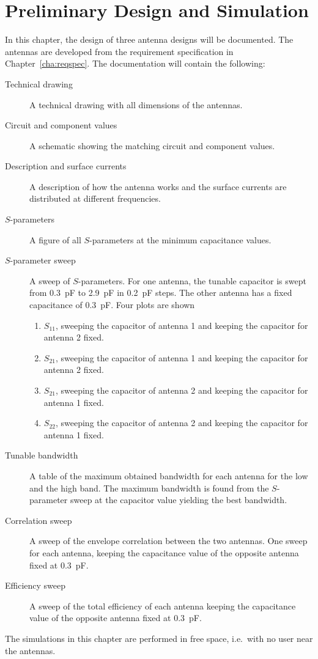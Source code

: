 \chapter{Preliminary Design and Simulation}
\label{cha:nousersim}
In this chapter, the design of three antenna designs will be documented. The antennas are developed from the requirement specification in Chapter~\ref{cha:reqspec}. The documentation will contain the following:
\begin{description}
\item[Technical drawing] A technical drawing with all dimensions of the antennas. 
\item[Circuit and component values] A schematic showing the matching circuit and component values.
\item[Description and surface currents] A description of how the antenna works and the surface currents are distributed at different frequencies.
\item[$S$-parameters] A figure of all $S$-parameters at the minimum capacitance values.
\item[$S$-parameter sweep] A sweep of $S$-parameters. For one antenna, the tunable capacitor is swept from \SI{0.3}{pF} to \SI{2.9}{pF} in \SI{0.2}{pF} steps. The other antenna has a fixed capacitance of \SI{0.3}{pF}. Four plots are shown
    \begin{enumerate}
    \item $S_{11}$, sweeping the capacitor of antenna 1 and keeping the capacitor for antenna 2 fixed.
    \item $S_{21}$, sweeping the capacitor of antenna 1 and keeping the capacitor for antenna 2 fixed.
    \item $S_{21}$, sweeping the capacitor of antenna 2 and keeping the capacitor for antenna 1 fixed.
    \item $S_{22}$, sweeping the capacitor of antenna 2 and keeping the capacitor for antenna 1 fixed.
    \end{enumerate}
\item[Tunable bandwidth] A table of the maximum obtained bandwidth for each antenna for the low and the high band. The maximum bandwidth is found from the $S$-parameter sweep at the capacitor value yielding the best bandwidth.
\item[Correlation sweep] A sweep of the envelope correlation between the two antennas. One sweep for each antenna, keeping the capacitance value of the opposite antenna fixed at \SI{0.3}{pF}.
\item[Efficiency sweep] A sweep of the total efficiency of each antenna keeping the capacitance value of the opposite antenna fixed at \SI{0.3}{pF}.
\end{description}

The simulations in this chapter are performed in free space, i.e.\ with no user near the antennas.
